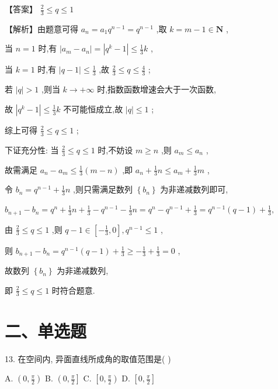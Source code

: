 \documentclass[10pt]{article}
\begin{document}
【答案】 \(\frac{2}{3} \leq  q \leq  1\)

【解析】由题意可得 \({a}_{n} = {a}_{1}{q}^{n - 1} = {q}^{n - 1}\) ,取 \(k = m - 1 \in  \mathbf{N}\) ,

当 \(n = 1\) 时,有 \(\left| {{a}_{m} - {a}_{n}}\right|  = \left| {{q}^{k} - 1}\right|  \leq  \frac{1}{3}k\) ,

当 \(k = 1\) 时,有 \(\left| {q - 1}\right|  \leq  \frac{1}{3}\) ,故 \(\frac{2}{3} \leq  q \leq  \frac{4}{3}\) ;

若 \(\left| q\right|  > 1\) ,则当 \(k \rightarrow   + \infty\) 时,指数函数增速会大于一次函数,

故 \(\left| {{q}^{k} - 1}\right|  \leq  \frac{1}{3}k\) 不可能恒成立,故 \(\left| q\right|  \leq  1\) ;

综上可得 \(\frac{2}{3} \leq  q \leq  1\) ;

下证充分性: 当 \(\frac{2}{3} \leq  q \leq  1\) 时,不妨设 \(m \geq  n\) ,则 \({a}_{m} \leq  {a}_{n}\) ,

故需满足 \({a}_{n} - {a}_{m} \leq  \frac{1}{3}\left( {m - n}\right)\) ,即 \({a}_{n} + \frac{1}{3}n \leq  {a}_{m} + \frac{1}{3}m\) ,

令 \({b}_{n} = {q}^{n - 1} + \frac{1}{3}n\) ,则只需满足数列 \(\left\{  {b}_{n}\right\}\) 为非递减数列即可,

\({b}_{n + 1} - {b}_{n} = {q}^{n} + \frac{1}{3}n + \frac{1}{3} - {q}^{n - 1} - \frac{1}{3}n = {q}^{n} - {q}^{n - 1} + \frac{1}{3} = {q}^{n - 1}\left( {q - 1}\right)  + \frac{1}{3},\)

由 \(\frac{2}{3} \leq  q \leq  1\) ,则 \(q - 1 \in  \left\lbrack  {-\frac{1}{3},0}\right\rbrack  ,{q}^{n - 1} \leq  1\) ,

则 \({b}_{n + 1} - {b}_{n} = {q}^{n - 1}\left( {q - 1}\right)  + \frac{1}{3} \geq   - \frac{1}{3} + \frac{1}{3} = 0\) ,

故数列 \(\left\{  {b}_{n}\right\}\) 为非递减数列,

即 \(\frac{2}{3} \leq  q \leq  1\) 时符合题意.

\section*{二、单选题}

13. 在空间内, 异面直线所成角的取值范围是( )

A. \(\left( {0,\frac{\pi }{2}}\right)\) B. \(\left( {0,\frac{\pi }{2}}\right\rbrack\) C. \(\left\lbrack  {0,\frac{\pi }{2}}\right)\) D. \(\left\lbrack  {0,\frac{\pi }{2}}\right\rbrack\)
\end{document}
